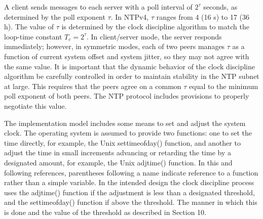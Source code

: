 A client sends messages to each server with a poll interval of $ 2^\tau $
seconds, as determined by the poll exponent $ \tau $. In NTPv4, $ \tau $
ranges from 4 (16 s) to 17 (36 h). The value of $ \tau $ is determined by
the clock discipline algorithm to match the loop-time constant $ T_c = 2^\tau $.
In client/server mode, the server responds immediately;
however, in symmetric modes, each of two peers manages $ \tau $ as a
function of current system offset and system jitter, so they may not
agree with the same value. It is important that the dynamic behavior
of the clock discipline algorithm be carefully controlled in order to
maintain stability in the NTP subnet at large. This requires that
the peers agree on a common $ \tau $ equal to the minimum poll exponent of
both peers. The NTP protocol includes provisions to properly
negotiate this value.

The implementation model includes some means to set and adjust the
system clock. The operating system is assumed to provide two
functions: one to set the time directly, for example, the Unix
settimeofday() function, and another to adjust the time in small
increments advancing or retarding the time by a designated amount,
for example, the Unix adjtime() function. In this and following
references, parentheses following a name indicate reference to a
function rather than a simple variable. In the intended design the
clock discipline process uses the adjtime() function if the
adjustment is less than a designated threshold, and the
settimeofday() function if above the threshold. The manner in which
this is done and the value of the threshold as described in
Section 10.
